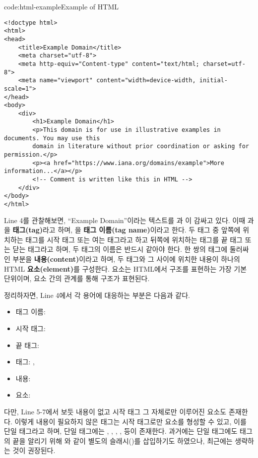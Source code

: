 \begin{code}{code:html-example}{Example of HTML}
\begin{verbatim}
<!doctype html>
<html>
<head>
    <title>Example Domain</title>
    <meta charset="utf-8">
    <meta http-equiv="Content-type" content="text/html; charset=utf-8">
    <meta name="viewport" content="width=device-width, initial-scale=1">
</head>
<body>
    <div>
        <h1>Example Domain</h1>
        <p>This domain is for use in illustrative examples in documents. You may use this
        domain in literature without prior coordination or asking for permission.</p>
        <p><a href="https://www.iana.org/domains/example">More information...</a></p>
        <!-- Comment is written like this in HTML -->
    </div>
</body>
</html>
\end{verbatim}
\end{code}

Line 4를 관찰해보면, ``Example Domain''이라는 텍스트를 과 이 감싸고 있다. 이때 과 을 \textbf{태그(tag)}라고 하며, 을 \textbf{태그 이름(tag name)}이라고 한다. 두 태그 중 앞쪽에 위치하는 태그를 시작 태그 또는 여는 태그라고 하고 뒤쪽에 위치하는 태그를 끝 태그 또는 닫는 태그라고 하며, 두 태그의 이름은 반드시 같아야 한다. 한 쌍의 태그에 둘러싸인 부분을 \textbf{내용(content)}이라고 하며, 두 태그와 그 사이에 위치한 내용이 하나의 HTML \textbf{요소(element)}를 구성한다. 요소는 HTML에서 구조를 표현하는 가장 기본 단위이며, 요소 간의 관계를 통해 구조가 표현된다.

정리하자면, Line 4에서 각 용어에 대응하는 부분은 다음과 같다.

\begin{itemize}
    \item 태그 이름: 
    \item 시작 태그: 
    \item 끝 태그: 
    \item 태그: , 
    \item 내용: 
    \item 요소: 
\end{itemize}

다만, Line 5-7에서 보듯 내용이 없고 시작 태그 그 자체로만 이루어진 요소도 존재한다. 이렇게 내용이 필요하지 않은 태그는 시작 태그로만 요소를 형성할 수 있고, 이를 단일 태그라고 하며, 단일 태그에는 , , , ,  등이 존재한다. 과거에는 단일 태그에도 태그의 끝을 알리기 위해 와 같이 별도의 슬래시(\cd{/})를 삽입하기도 하였으나, 최근에는 생략하는 것이 권장된다.

